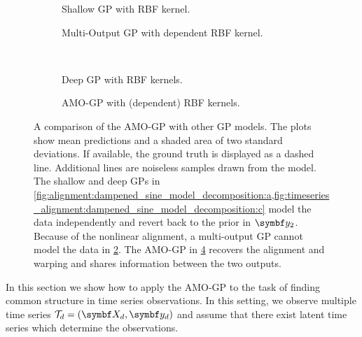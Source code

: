\begin{figure}[tp]
    \centering
    \begin{subfigure}{\halffigurewidth}
        \centering
        \caption{
            Shallow GP with RBF kernel.
            \label{fig:alignment:dampened_sine_model_decomposition:a}
        }
    \end{subfigure}
    \hfill
    \begin{subfigure}{\halffigurewidth}
        \centering
        \caption{
            Multi-Output GP with dependent RBF kernel.
            \label{fig:alignment:dampened_sine_model_decomposition:b}
        }
    \end{subfigure}
    \\[\baselineskip]
    \begin{subfigure}{\halffigurewidth}
        \centering
        \caption{
            Deep GP with RBF kernels.
            \label{fig:alignment:dampened_sine_model_decomposition:c}
        }
    \end{subfigure}
    \hfill
    \begin{subfigure}{\halffigurewidth}
        \centering
        \caption{
            AMO-GP with (dependent) RBF kernels.
            \label{fig:alignment:dampened_sine_model_decomposition:d}
        }
    \end{subfigure}
    \caption{
        \label{fig:alignment:dampened_sine_model_decomposition}
        A comparison of the AMO-GP with other GP models.
        The plots show mean predictions and a shaded area of two standard deviations.
        If available, the ground truth is displayed as a dashed line.
        Additional lines are noiseless samples drawn from the model.
        The shallow and deep GPs in \cref{fig:alignment:dampened_sine_model_decomposition:a,fig:timeseries_alignment:dampened_sine_model_decomposition:c} model the data independently and revert back to the prior in $\rv{y_2}$.
        Because of the nonlinear alignment, a multi-output GP cannot model the data in \cref{fig:alignment:dampened_sine_model_decomposition:b}.
        The AMO-GP in \cref{fig:alignment:dampened_sine_model_decomposition:d} recovers the alignment and warping and shares information between the two outputs.
    }
\end{figure}
In this section we show how to apply the AMO-GP to the task of finding common structure in time series observations.
In this setting, we observe multiple time series $\Tc_d = (\mat{X_d}, \mat{y_d})$ and assume that there exist latent time series which determine the observations.

